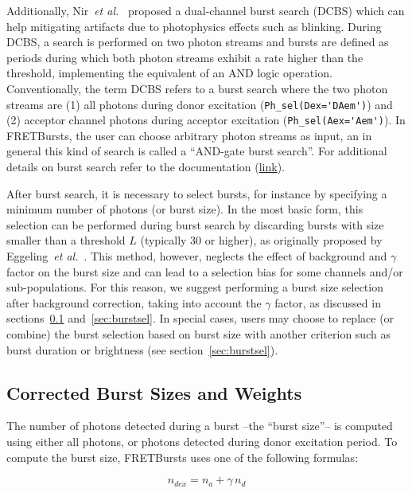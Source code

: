 Additionally, Nir~\textit{et al.}~\cite{Nir_2006} proposed a dual-channel 
burst search (DCBS) 
which can help mitigating artifacts due to photophysics effects such as blinking.
During DCBS, a search is performed on two photon streams
and bursts are defined as periods during which both photon streams 
exhibit a rate higher than
the threshold, implementing the equivalent of an AND logic operation.
Conventionally, the term DCBS refers to a burst search where the two photon streams
are (1) all photons during donor excitation (\verb|Ph_sel(Dex='DAem')|) and
(2) acceptor channel photons during acceptor excitation (\verb|Ph_sel(Aex='Aem')|).
In FRETBursts, the user can choose arbitrary photon streams as input, an in general
this kind of search is called a ``AND-gate burst search''.
For additional details on burst search refer to the documentation
(\href{http://fretbursts.readthedocs.io/en/latest/burstsearch.html}{link}).

After burst search, it is necessary to select
bursts, for instance by specifying a minimum number of photons (or burst size). In the most
basic form, this selection can be performed during burst search by discarding
bursts with size smaller than a threshold $L$ (typically 30 or higher), 
as originally proposed by
Eggeling~\textit{et al.}~\cite{Eggeling_1998}.
This method, however, neglects the effect
of background and $\gamma$ factor on the burst size and can lead to a selection
bias for some channels and/or sub-populations.
For this reason, we suggest performing a burst size selection after background
correction, taking into account the $\gamma$ factor, as discussed in
sections~\ref{sec:burstsizeweights} and~\ref{sec:burstsel}.
In special cases, users may choose to replace (or combine)
the burst selection based on burst size
with another criterion such as burst duration or brightness (see section~\ref{sec:burstsel}).

\subsection{Corrected Burst Sizes and Weights}
\label{sec:burstsizeweights}

The number of photons detected during a burst --the ``burst size''--
is computed using either all photons, or photons detected
during donor excitation period. To compute the burst size, FRETBursts uses
one of the following formulas:

\begin{equation}
\label{eq:burstsize_dex}
n_{dex} = n_a + \gamma\,n_d
\end{equation}

